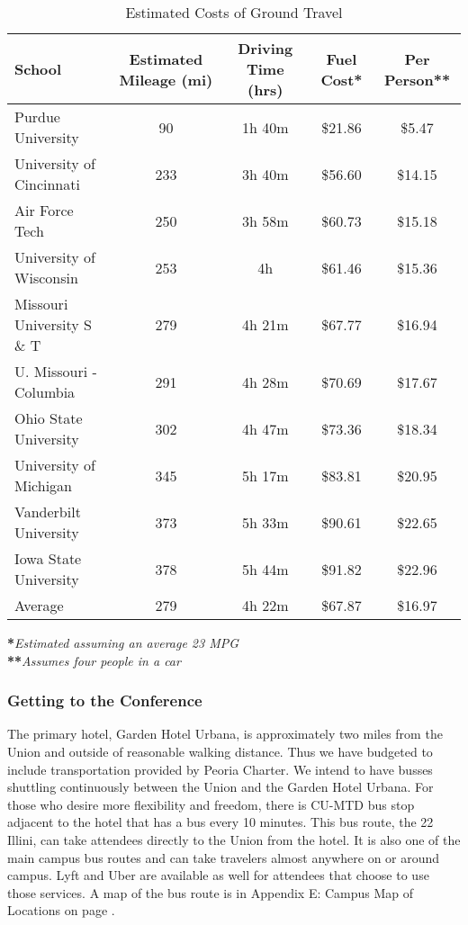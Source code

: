 \begin{table}[H]
\caption{Estimated Costs of Ground Travel}
\label{table:ground}
   \begin{tabular}{lcccc}
   \hline\hline
   \textbf{School}&\textbf{Estimated Mileage (mi)}&\textbf{Driving Time (hrs)}&\textbf{Fuel Cost*}&\textbf{Per Person**}\\
   \hline\hline
    Purdue University&90&1h 40m&\$21.86&\$5.47\\
    University of Cincinnati&233& 3h 40m&\$56.60&\$14.15\\
    Air Force Tech &250&3h 58m&\$60.73&\$15.18\\
    University of Wisconsin&253&4h&\$61.46&\$15.36\\
    Missouri University S \& T &279&4h 21m&\$67.77&\$16.94\\
    U. Missouri - Columbia&291&4h 28m&\$70.69&\$17.67\\
    Ohio State University&302&4h 47m&\$73.36&\$18.34\\
    University of Michigan&345&5h 17m&\$83.81&\$20.95\\
    Vanderbilt University&373&5h 33m&\$90.61&\$22.65\\
    Iowa State University&378&5h 44m&\$91.82&\$22.96\\
    \hline
    Average&279&4h 22m&\$67.87&\$16.97

    \end{tabular} 
\end{table}
\noindent\textbf{*}\textit{Estimated assuming an average 23 MPG}\\
\textbf{**}\textit{Assumes four people in a car}

\subsubsection{Getting to the Conference}
The primary hotel, Garden Hotel Urbana, is approximately two miles from the Union and outside of reasonable walking distance. Thus we have budgeted to include transportation provided by Peoria Charter. We intend to have busses shuttling continuously between the Union and the Garden Hotel Urbana. For those who desire more flexibility and freedom, there is CU-MTD bus stop adjacent to the hotel that has a bus every 10 minutes. This bus route, the 22 Illini, can take attendees directly to the Union from the hotel. It is also one of the main campus bus routes and can take travelers almost anywhere on or around campus. Lyft and Uber are available as well for attendees that choose to use those services. A map of the bus route is in Appendix E: Campus Map of Locations on page \pageref{appendix:map}.

